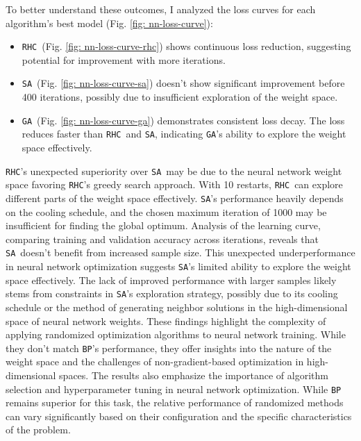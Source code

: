 \documentclass[conference]{IEEEtran}
\newcommand{\sa}{\texttt{SA}}
\newcommand{\ga}{\texttt{GA}}
\newcommand{\rhc}{\texttt{RHC}}
\begin{document}
To better understand these outcomes, I analyzed the loss curves for each algorithm's best model (Fig. \ref{fig: nn-loss-curve}):
\begin{itemize}
    \item \rhc\ (Fig. \ref{fig: nn-loss-curve-rhc}) shows continuous loss reduction, suggesting potential for improvement with more iterations.
    \item \sa\ (Fig. \ref{fig: nn-loss-curve-sa}) doesn't show significant improvement before 400 iterations, possibly due to insufficient exploration of the weight space.
    \item \ga\ (Fig. \ref{fig: nn-loss-curve-ga}) demonstrates consistent loss decay. The loss reduces faster than \rhc\ and \sa, indicating \ga's ability to explore the weight space effectively.
\end{itemize}
\rhc's unexpected superiority over \sa\ may be due to the neural network weight space favoring \rhc's greedy search approach. With 10 restarts, \rhc\ can explore different parts of the weight space effectively. \sa's performance heavily depends on the cooling schedule, and the chosen maximum iteration of 1000 may be insufficient for finding the global optimum.
Analysis of the learning curve, comparing training and validation accuracy across iterations, reveals that \sa\ doesn't benefit from increased sample size. This unexpected underperformance in neural network optimization suggests \sa's limited ability to explore the weight space effectively. The lack of improved performance with larger samples likely stems from constraints in \sa's exploration strategy, possibly due to its cooling schedule or the method of generating neighbor solutions in the high-dimensional space of neural network weights.
These findings highlight the complexity of applying randomized optimization algorithms to neural network training. While they don't match \verb|BP|'s performance, they offer insights into the nature of the weight space and the challenges of non-gradient-based optimization in high-dimensional spaces.
The results also emphasize the importance of algorithm selection and hyperparameter tuning in neural network optimization. While \verb|BP| remains superior for this task, the relative performance of randomized methods can vary significantly based on their configuration and the specific characteristics of the problem.
\end{document}
